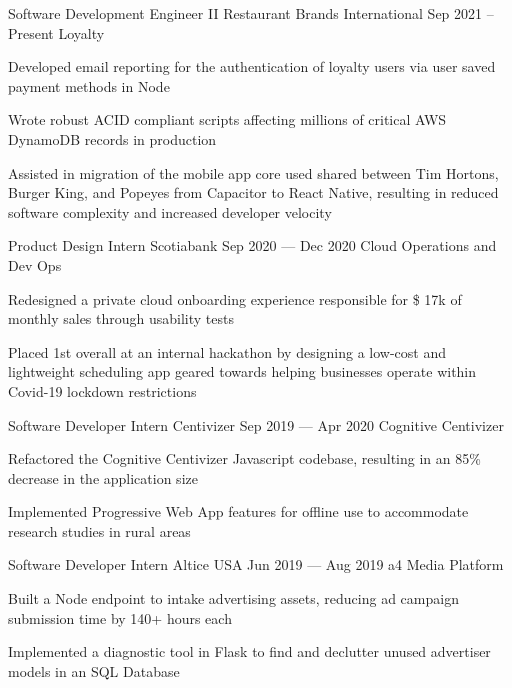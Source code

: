\begin{cventries}
  \cventry
      {Software Development Engineer II}
      {Restaurant Brands International}
      {}
      {Sep 2021 -- Present}
      {Loyalty}
      {
        \begin{cvitems}
          \item {Developed email reporting for the authentication of loyalty users via user saved payment methods in Node}
          \item {Wrote robust ACID compliant scripts affecting millions of critical AWS DynamoDB records in production}
          \item {Assisted in migration of the mobile app core used shared between Tim Hortons, Burger King, and Popeyes from Capacitor to React Native, resulting in reduced software complexity and increased developer velocity}
        \end{cvitems}
      }
  \cventry
    {Product Design Intern}
    {Scotiabank}
    {}
    {Sep 2020 --- Dec 2020}
    {Cloud Operations and Dev Ops}
    {
      \begin{cvitems}
        \item {Redesigned a private cloud onboarding experience responsible for \$ 17k of monthly sales through usability tests}
        \item {Placed 1st overall at an internal hackathon by designing a low-cost and lightweight scheduling app geared towards helping businesses operate within Covid-19 lockdown restrictions}
      \end{cvitems}
    }
  \cventry
    {Software Developer Intern}
    {Centivizer}
    {}
    {Sep 2019 --- Apr 2020}
    {Cognitive Centivizer}
    {
      \begin{cvitems}
        \item {Refactored the Cognitive Centivizer Javascript codebase, resulting in an 85\% decrease in the application size}
        \item {Implemented Progressive Web App features for offline use to accommodate research studies in rural areas}
      \end{cvitems}
    }

  \cventry
    {Software Developer Intern}
    {Altice USA}
    {}
    {Jun 2019 --- Aug 2019}
    {a4 Media Platform}
    {
    \begin{cvitems}
      \item {Built a Node endpoint to intake advertising assets, reducing ad campaign submission time by 140+ hours each}
      \item {Implemented a diagnostic tool in Flask to find and declutter unused advertiser models in an SQL Database}
    \end{cvitems}
    }


\end{cventries}
